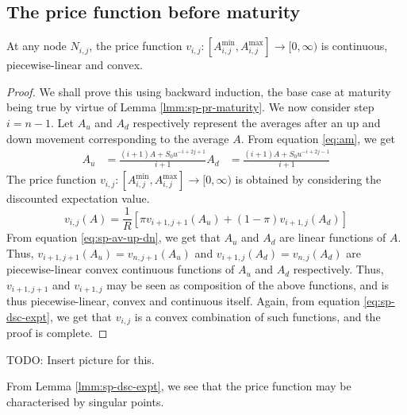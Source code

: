 \subsection{The price function before maturity}

\begin{lmm}
	\label{lmm:sp-dsc-expt}
	At any node $ N_{i,j} $, the price function $ v_{i,j}: \left[ A_{i,j}^{\min}, A_{i,j}^{\max} \right] \to [0, \infty) $ is continuous, piecewise-linear and convex.
\end{lmm}

\begin{proof}
	We shall prove this using backward induction, the base case at maturity being true by virtue of Lemma \ref{lmm:sp-pr-maturity}.
	We now consider step $ i = n-1 $. Let $A_u$ and $A_d$ respectively represent the averages after an up and down movement corresponding to the average $A$. From equation \ref{eq:am}, we get
	\begin{subequations}
		\label{eq:sp-av-up-dn}
		\begin{align}
			A_u &= \frac{ (i+1) A + S_0 u^{-i+2j+1} }{ i+1 }
						A_d &= \frac{ (i+1) A + S_0 u^{-i+2j-1} }{ i+1 }
		\end{align}
	\end{subequations}
	The price function $ v_{i,j}: \left[ A_{i,j}^{\min}, A_{i,j}^{\max} \right] \to [0, \infty) $ is obtained by considering the discounted expectation value.
	\begin{equation}
		\label{eq:sp-dsc-expt}
		v_{i,j}(A) = \frac{1}{R} \left[ \pi v_{i+1,j+1}(A_u) + (1 - \pi) v_{i+1,j}(A_d) \right]
	\end{equation}
	From equation \ref{eq:sp-av-up-dn}, we get that $A_u$ and $A_d$ are linear functions of $A$. Thus, $ v_{i+1,j+1}(A_u) = v_{n,j+1}(A_u)$ and $ v_{i+1,j}(A_d) = v_{n,j}(A_d) $ are piecewise-linear convex continuous functions of $A_u$ and $A_d$ respectively. Thus, $ v_{i+1,j+1} $ and $ v_{i+1,j} $ may be seen as composition of the above functions, and is thus piecewise-linear, convex and continuous itself. Again, from equation \ref{eq:sp-dsc-expt}, we get that $v_{i,j}$ is a convex combination of such functions, and the proof is complete.
\end{proof}
TODO: Insert picture for this.


\begin{rem}
	From Lemma \ref{lmm:sp-dsc-expt}, we see that the price function may be characterised by singular points.
\end{rem}



